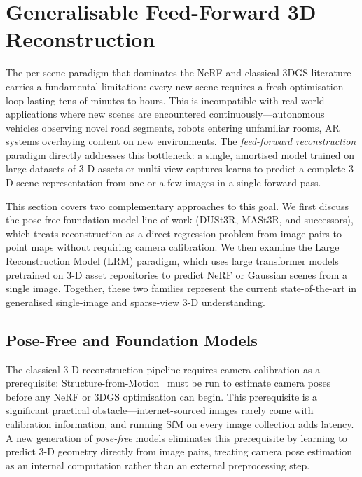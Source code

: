 \section{Generalisable Feed-Forward 3D Reconstruction}
\label{sec:generalisable}

The per-scene paradigm that dominates the NeRF and classical 3DGS literature
carries a fundamental limitation: every new scene requires a fresh optimisation
loop lasting tens of minutes to hours.
This is incompatible with real-world applications where new scenes are encountered
continuously---autonomous vehicles observing novel road segments, robots
entering unfamiliar rooms, AR systems overlaying content on new environments.
The \emph{feed-forward reconstruction} paradigm directly addresses this bottleneck:
a single, amortised model trained on large datasets of 3-D assets or multi-view
captures learns to predict a complete 3-D scene representation from one or
a few images in a single forward pass.

This section covers two complementary approaches to this goal.
We first discuss the pose-free foundation model line of work (DUSt3R, MASt3R,
and successors), which treats reconstruction as a direct regression problem
from image pairs to point maps without requiring camera calibration.
We then examine the Large Reconstruction Model (LRM) paradigm, which uses
large transformer models pretrained on 3-D asset repositories to predict
NeRF or Gaussian scenes from a single image.
Together, these two families represent the current state-of-the-art in
generalised single-image and sparse-view 3-D understanding.

\subsection{Pose-Free and Foundation Models}

The classical 3-D reconstruction pipeline requires camera calibration as a
prerequisite: Structure-from-Motion~\citep{schoenberger2016sfm} must be run
to estimate camera poses before any NeRF or 3DGS optimisation can begin.
This prerequisite is a significant practical obstacle---internet-sourced images
rarely come with calibration information, and running SfM on every image
collection adds latency.
A new generation of \emph{pose-free} models eliminates this prerequisite by
learning to predict 3-D geometry directly from image pairs, treating camera
pose estimation as an internal computation rather than an external preprocessing
step.

